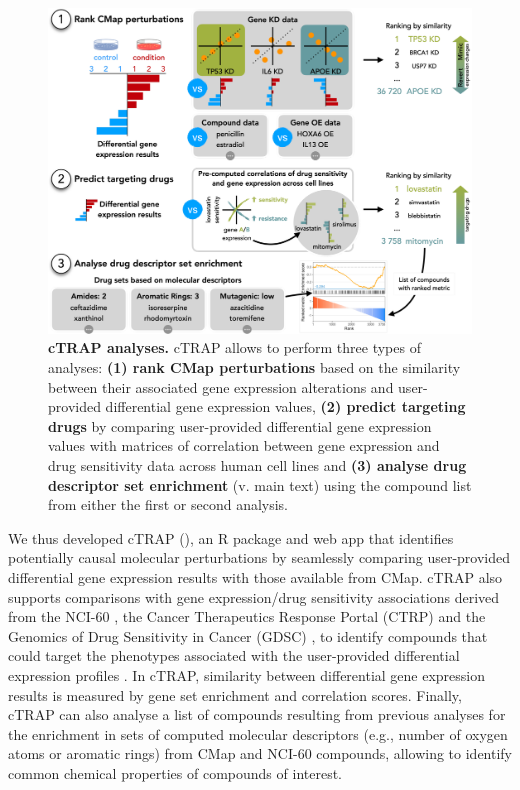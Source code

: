 \begin{figure}[!b]
  \includegraphics[width=\textwidth]{images/ctrap/ctrap}
  \centering
  \caption[cTRAP analyses]{\textbf{cTRAP analyses.} cTRAP allows to perform three types of analyses: \textbf{(1) rank CMap perturbations} based on the similarity between their associated gene expression alterations and user-provided differential gene expression values, \textbf{(2) predict targeting drugs} by comparing user-provided differential gene expression values with matrices of correlation between gene expression and drug sensitivity data across human cell lines and \textbf{(3) analyse drug descriptor set enrichment} (v. main text) using the compound list from either the first or second analysis.}
  \label{fig:ctrap}
\end{figure}

We thus developed cTRAP (), an R package and web app that identifies potentially causal molecular perturbations by seamlessly comparing user-provided differential gene expression results with those available from CMap. cTRAP also supports comparisons with gene expression/drug sensitivity associations derived from the NCI-60 \cite{shoemaker:2006wi}, the Cancer Therapeutics Response Portal (CTRP) \cite{seashore-ludlow:2015ws} and the Genomics of Drug Sensitivity in Cancer (GDSC) \cite{yang:2012vk}, to identify compounds that could target the phenotypes associated with the user-provided differential expression profiles \cite{almeida:2019wh}. In cTRAP, similarity between differential gene expression results is measured by gene set enrichment \cite{subramanian:2017ul,subramanian:2005wu} and correlation scores. Finally, cTRAP can also analyse a list of compounds resulting from previous analyses for the enrichment in sets of computed molecular descriptors (e.g., number of oxygen atoms or aromatic rings) from CMap and NCI-60 compounds, allowing to identify common chemical properties of compounds of interest.

